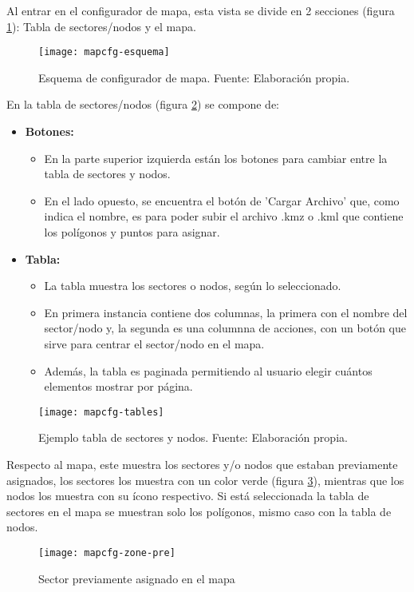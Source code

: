 Al entrar en el configurador de mapa, esta vista se divide en 2 secciones (figura \ref{fig:mapcfg-esquema}): Tabla de sectores/nodos y el mapa.
\begin{figure}[H]
	\centering
	\texttt{[image: mapcfg-esquema]}
	\caption{\label{fig:mapcfg-esquema} Esquema de configurador de mapa. Fuente: Elaboración propia.}
\end{figure}

En la tabla de sectores/nodos (figura \ref{fig:mapcfg-tables-exameple}) se compone de:

\begin{itemize}
    \item \textbf{Botones:}
          \begin{itemize}
              \item En la parte superior izquierda están los botones para cambiar entre la tabla de sectores y nodos.
              \item En el lado opuesto, se encuentra el botón de 'Cargar Archivo' que, como indica el nombre, es para poder subir el archivo .kmz o .kml que contiene los polígonos y puntos para asignar.
          \end{itemize}
    \item \textbf{Tabla:}  
    \begin{itemize}
        \item La tabla muestra los sectores o nodos, según lo seleccionado.
        \item En primera instancia contiene dos columnas, la primera con el nombre del sector/nodo y, la segunda es una columnna de acciones, con un botón que sirve para centrar el sector/nodo en el mapa. 
        \item Además, la tabla es paginada permitiendo al usuario elegir cuántos elementos mostrar por página.
    \end{itemize}
\end{itemize}

\begin{figure}[H]
	\centering
	\texttt{[image: mapcfg-tables]}
	\caption{\label{fig:mapcfg-tables-exameple} Ejemplo tabla de sectores y nodos. Fuente: Elaboración propia.}
\end{figure}


Respecto al mapa, este muestra los sectores y/o nodos que estaban previamente asignados, los sectores los muestra con un color verde (figura \ref{fig:mapcfg-zone-pre}), mientras que los nodos los muestra con su ícono respectivo. Si está seleccionada la tabla de sectores en el mapa se muestran solo los polígonos, mismo caso con la tabla de nodos.
\begin{figure}[H]
	\centering
	\texttt{[image: mapcfg-zone-pre]}
	\caption{\label{fig:mapcfg-zone-pre} Sector previamente asignado en el mapa}
\end{figure}

